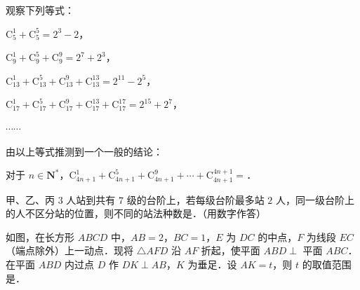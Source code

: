 \begin{question}
观察下列等式：

$\mathrm C_5^1+\mathrm C_5^5=2^3-2$，

$\mathrm C_9^1+\mathrm C_9^5+\mathrm C_9^9=2^7+2^3$，

$\mathrm C_{13}^1+\mathrm C_{13}^5+\mathrm C_{13}^9+\mathrm C_{13}^{13}=2^{11}-2^5$，

$\mathrm C_{17}^1+\mathrm C_{17}^5+\mathrm C_{17}^9+\mathrm C_{17}^{13}+\mathrm C_{17}^{17}=2^{15}+2^7$，

$\cdots\cdots$

由以上等式推测到一个一般的结论：

对于 $n\in\mathbf N^*$，$\mathrm C_{4n+1}^1+\mathrm C_{4n+1}^5+\mathrm C_{4n+1}^9+\cdots+\mathrm C_{4n+1}^{4n+1}=$\gkblank{}．

\end{question}
\begin{question}
甲、乙、丙 $3$ 人站到共有 $7$ 级的台阶上，若每级台阶最多站 $2$ 人，同一级台阶上的人不区分站的位置，则不同的站法种数是\gkblank{}．（用数字作答）

\Needspace{0.4\textheight}
\end{question}
\begingroup
\renewenvironment{question}{\Needspace{0.5\textheight}}{}
\begin{question}
如图，在长方形 $ABCD$ 中，$AB=2$，$BC=1$，$E$ 为 $DC$ 的中点，$F$ 为线段 $EC$（端点除外）上一动点．现将 $\triangle AFD$ 沿 $AF$ 折起，使平面 $ABD\perp$ 平面 $ABC$．在平面 $ABD$ 内过点 $D$ 作 $DK\perp AB$，$K$ 为垂足．设 $AK=t$，则 $t$ 的取值范围是\gkblank{}．
\nopagebreak[4]
\begin{center}\end{center}
\nopagebreak[4]
\end{question}
\endgroup
{}

